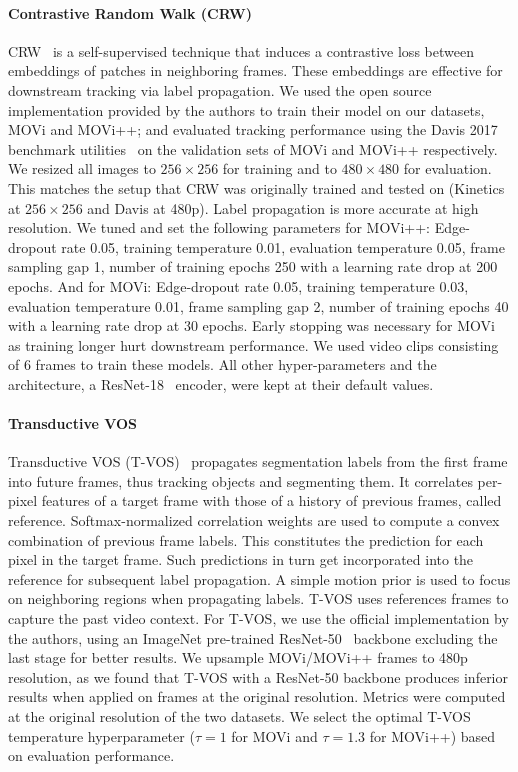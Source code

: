\documentclass{article}
\begin{document}
\paragraph{Contrastive Random Walk (CRW)}\label{sec:appendix:baseline:crw}
CRW~\citep{jabri2020space} is a self-supervised technique that induces a contrastive loss between embeddings of patches in neighboring frames. These embeddings are effective for downstream tracking via label propagation. We used the open source implementation provided by the authors to train their model on our datasets, MOVi and MOVi++; and evaluated tracking performance using the Davis 2017 benchmark utilities~\citep{caelles2019the,ponttuset2017the} on the validation sets of MOVi and MOVi++ respectively. We resized all images to $256 \times 256$ for training and to $480 \times 480$ for evaluation. This matches the setup that CRW was originally trained and tested on (Kinetics at $256\times 256$ and Davis at 480p). Label propagation is more accurate at high resolution. We tuned and set the following parameters for MOVi++: Edge-dropout rate 0.05, training temperature 0.01, evaluation temperature 0.05, frame sampling gap 1, number of training epochs 250 with a learning rate drop at 200 epochs. And for MOVi: Edge-dropout rate 0.05, training temperature 0.03, evaluation temperature 0.01, frame sampling gap 2, number of training epochs 40 with a learning rate drop at 30 epochs. Early stopping was necessary for MOVi as training longer hurt downstream performance. We used video clips consisting of 6 frames to train these models. All other hyper-parameters and the architecture, a ResNet-18~\citep{he2016deep} encoder, were kept at their default values.

\paragraph{Transductive VOS}\label{sec:appendix:baseline:tvos}
Transductive VOS (T-VOS)~\citep{zhang2020transductive} propagates segmentation labels from the first frame into future frames, thus tracking objects and segmenting them. It correlates per-pixel features of a target frame with those of a history of previous frames, called reference. Softmax-normalized correlation weights are used to compute a convex combination of previous frame labels. This constitutes the prediction for each pixel in the target frame. Such predictions in turn get incorporated into the reference for subsequent label propagation. A simple motion prior is used to focus on neighboring regions when propagating labels. T-VOS uses references frames to capture the past video context. For T-VOS, we use the official implementation by the authors, using an ImageNet pre-trained ResNet-50~\citep{he2016deep} backbone excluding the last stage for better results. We upsample MOVi/MOVi++ frames to 480p resolution, as we found that T-VOS with a ResNet-50 backbone produces inferior results when applied on frames at the original resolution. Metrics were computed at the original resolution of the two datasets. We select the optimal T-VOS temperature hyperparameter ($\tau=1$ for MOVi and $\tau=1.3$ for MOVi++) based on evaluation performance.
\end{document}
